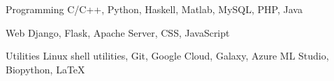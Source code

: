 
\vspace{-0.3cm}


\begin{cvskills}


  \cvskill
  {Programming}
  {C/C++, Python, Haskell, Matlab, MySQL, PHP, Java}


  \cvskill
  {Web}
  {Django, Flask, Apache Server, CSS, JavaScript }


  \cvskill
  {Utilities}
  {Linux shell utilities, Git, Google Cloud,
    Galaxy, Azure ML Studio, Biopython, \LaTeX}


\end{cvskills}

